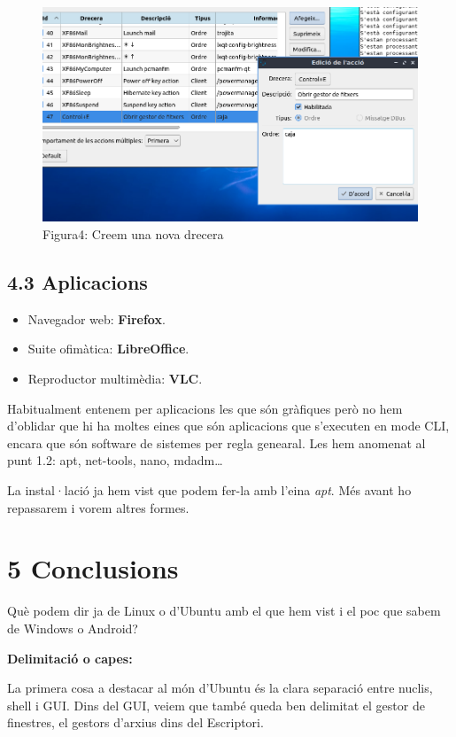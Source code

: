 \documentclass[
  a4paper,
]{article}
\providecommand{\tightlist}{%
  \setlength{\itemsep}{0pt}\setlength{\parskip}{0pt}}
\begin{document}
\begin{figure}
\centering
\includegraphics{png/Drecera3.png}
\caption{Figura4: Creem una nova drecera}
\end{figure}

\subsection{4.3 Aplicacions}\label{aplicacions}

\begin{itemize}
\tightlist
\item
  Navegador web: \textbf{Firefox}.
\item
  Suite ofimàtica: \textbf{LibreOffice}.
\item
  Reproductor multimèdia: \textbf{VLC}.
\end{itemize}

Habitualment entenem per aplicacions les que són gràfiques però no hem
d'oblidar que hi ha moltes eines que són aplicacions que s'executen en
mode CLI, encara que són software de sistemes per regla genearal. Les
hem anomenat al punt 1.2: apt, net-tools, nano, mdadm\ldots{}

La instal·lació ja hem vist que podem fer-la amb l'eina \emph{apt}. Més
avant ho repassarem i vorem altres formes.

\section{5 Conclusions}\label{conclusions}

Què podem dir ja de Linux o d'Ubuntu amb el que hem vist i el poc que
sabem de Windows o Android?

\textbf{Delimitació o capes:}

La primera cosa a destacar al món d'Ubuntu és la clara separació entre
nuclis, shell i GUI. Dins del GUI, veiem que també queda ben delimitat
el gestor de finestres, el gestors d'arxius dins del Escriptori.
\end{document}
